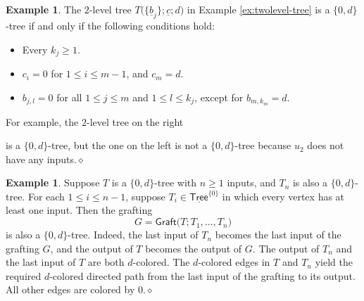 \documentclass{amsbook}
\numberwithin{section}{chapter}
\numberwithin{subsection}{section}
\numberwithin{equation}{section}
\theoremstyle{plain}
\theoremstyle{definition}
\newtheorem{example}[equation]{Example}
\newcommand{\graft}{\mathsf{Graft}}
\newcommand{\zerod}{\{0,d\}}
\newcommand{\dqed}{\hfill$\diamond$}
\newcommand{\Tree}{\mathsf{Tree}}
\newcommand{\uTree}{\underline{\Tree}}
\newcommand{\uTreezero}{\uTree^{\{0\}}}
\newcommand{\ub}{\underline b}
\newcommand{\uc}{\underline c}
\begin{document}
\begin{example} The $2$-level tree $T\bigl(\{\ub_j\};\uc;d\bigr)$ in Example \ref{ex:twolevel-tree} is a $\zerod$-tree if and only if the following conditions hold:
\begin{itemize}
\item Every $k_j \geq 1$.
\item $c_i=0$ for $1 \leq i \leq m-1$, and $c_m=d$.
\item $b_{j,l}=0$ for all $1 \leq j \leq m$ and $1 \leq l \leq k_j$, except for $b_{m,k_m}=d$.
\end{itemize}
For example, the $2$-level tree on the right
\begin{center}\end{center}
is a $\zerod$-tree, but the one on the left is not a $\zerod$-tree because $u_2$ does not have any inputs.\dqed
\end{example}

\begin{example} Suppose $T$ is a $\zerod$-tree with $n \geq 1$ inputs, and $T_n$ is also a $\zerod$-tree.  For each $1 \leq i \leq n-1$, suppose $T_i \in \uTreezero$ in which every vertex has at least one input.  Then the grafting \[G=\graft\bigl(T;T_1,\ldots,T_n)\] is also a $\zerod$-tree.  Indeed, the last input of $T_n$ becomes the last input of the grafting $G$, and the output of $T$ becomes the output of $G$.  The output of $T_n$ and the last input of $T$ are both $d$-colored.  The $d$-colored edges in $T$ and $T_n$ yield the required $d$-colored directed path from the last input of the grafting to its output.  All other edges are colored by $0$.\dqed
\end{example}
\end{document}
